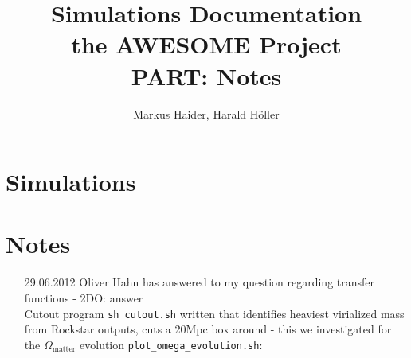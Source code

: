 \documentclass[a4paper,11pt,fleqn,oneside]{book}
\author{Markus Haider, Harald H\"oller}
\begin{document}
\title{\textbf{Simulations Documentation} \\
the AWESOME Project \\
PART: Notes }
\maketitle
\tableofcontents

\chapter{Simulations} 
\chapter{Notes}
\begin{itemize}

\item[29.06.2012]
Oliver Hahn has answered to my question regarding transfer functions - 2DO: answer \\
Cutout program \texttt{sh cutout.sh} written that identifies heaviest virialized mass 
from Rockstar outputs, cuts a 20Mpc box around -  this we investigated 
for the $ \Omega_{\text{matter}}$ evolution \texttt{plot\_omega\_evolution.sh}: 


\end{itemize}
\end{document}
